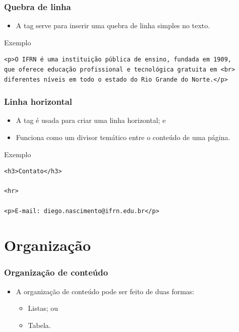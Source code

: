 \documentclass[aspectratio=169]{beamer} %
\begin{document}
\begin{frame}[fragile]
	\frametitle{Quebra de linha}
	
	\begin{itemize}
		\item A tag   serve para inserir uma quebra de linha simples no texto.
	\end{itemize}\vfill
	
	\begin{exampleblock}{Exemplo}
		\begin{lstlisting}
<p>O IFRN é uma instituição pública de ensino, fundada em 1909, 
que oferece educação profissional e tecnológica gratuita em <br>
diferentes níveis em todo o estado do Rio Grande do Norte.</p>		
		\end{lstlisting}
	\end{exampleblock}
\end{frame}

\begin{frame}[fragile]
	\frametitle{Linha horizontal}
	
	\begin{itemize}
		\item A tag  é usada para criar uma linha horizontal; e
		\item Funciona como um divisor temático entre o conteúdo de uma página.
	\end{itemize}\vfill
	
	\begin{exampleblock}{Exemplo}
		\begin{lstlisting}
<h3>Contato</h3>

<hr>

<p>E-mail: diego.nascimento@ifrn.edu.br</p>
		\end{lstlisting}
	\end{exampleblock}
\end{frame}

\section{Organização}

\begin{frame}
	\frametitle{Organização de conteúdo}
	
	\begin{itemize}
		\item A organização de conteúdo pode ser feito de duas formas: 
		\begin{itemize}
			\item Listas; ou
			\item Tabela.
		\end{itemize}
	\end{itemize}
\end{frame}
\end{document}
